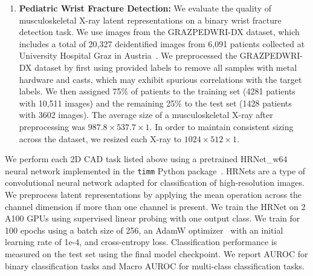 \begin{enumerate}
    \item \textbf{Pediatric Wrist Fracture Detection:} We evaluate the quality of musculoskeletal X-ray latent representations on a binary wrist fracture detection task. We use images from the GRAZPEDWRI-DX dataset, which includes a total of 20,327 deidentified images from 6,091 patients collected at University Hospital Graz in Austria~\cite{Nagy2022wristfrac}. We preprocessed the GRAZPEDWRI-DX dataset by first using provided labels to remove all samples with metal hardware and casts, which may exhibit spurious correlations with the target labels. We then assigned 75\% of patients to the training set (4281 patients with 10,511 images) and the remaining 25\% to the test set (1428 patients with 3602 images). The average size of a musculoskeletal X-ray after preprocessing was $987.8 \times 537.7 \times 1$. In order to maintain consistent sizing across the dataset, we resized each X-ray to $1024 \times 512 \times 1$.
\end{enumerate}

We perform each 2D CAD task listed above using a pretrained HRNet\_w64 neural network implemented in the \texttt{timm} Python package~\cite{wang2020hrnet,timm}. HRNets are a type of convolutional neural network adapted for classification of high-resolution images. We preprocess latent representations by applying the mean operation across the channel dimension if more than one channel is present. We train the HRNet on 2 A100 GPUs using supervised linear probing with one output class. We train for 100 epochs using a batch size of 256, an AdamW optimizer~\cite{adamw} with an initial learning rate of 1e-4, and cross-entropy loss. Classification performance is measured on the test set using the final model checkpoint. We report AUROC for binary classification tasks and Macro AUROC for multi-class classification tasks. 

